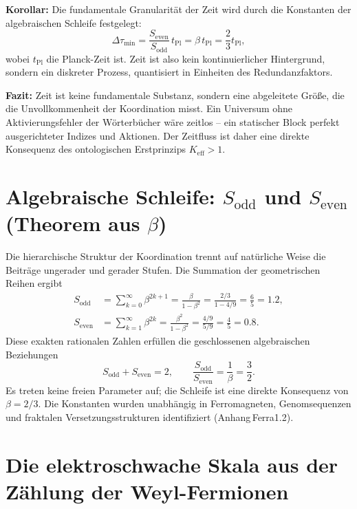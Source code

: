 \documentclass[12pt,a4paper]{article}
\begin{document}
	\noindent
	\textbf{Korollar:} Die fundamentale Granularität der Zeit wird durch die Konstanten der algebraischen Schleife festgelegt:
	\[
	\Delta \tau_{\min} = \frac{S_{\mathrm{even}}}{S_{\mathrm{odd}}} \, t_{\mathrm{Pl}}
	= \beta \, t_{\mathrm{Pl}} = \frac{2}{3} t_{\mathrm{Pl}},
	\]
	wobei \(t_{\mathrm{Pl}}\) die Planck-Zeit ist.  Zeit ist also kein kontinuierlicher Hintergrund, sondern ein diskreter Prozess, quantisiert in Einheiten des Redundanzfaktors.
	
	\noindent
	\textbf{Fazit:} Zeit ist keine fundamentale Substanz, sondern eine abgeleitete Größe, die die Unvollkommenheit der Koordination misst.  Ein Universum ohne Aktivierungsfehler der Wörterbücher wäre zeitlos – ein statischer Block perfekt ausgerichteter Indizes und Aktionen.  Der Zeitfluss ist daher eine direkte Konsequenz des ontologischen Erstprinzips \(K_{\mathrm{eff}} > 1\).
	
	\section{Algebraische Schleife: \(S_{\mathrm{odd}}\) und \(S_{\mathrm{even}}\) (Theorem aus \(\beta\))}
	
	Die hierarchische Struktur der Koordination trennt auf natürliche Weise die Beiträge ungerader und gerader Stufen.  Die Summation der geometrischen Reihen ergibt
	\begin{align}
		S_{\mathrm{odd}} &= \sum_{k=0}^{\infty} \beta^{2k+1} = \frac{\beta}{1-\beta^{2}} = \frac{2/3}{1 - 4/9} = \frac{6}{5} = 1.2, \label{eq:sodd}\\
		S_{\mathrm{even}} &= \sum_{k=1}^{\infty} \beta^{2k} = \frac{\beta^{2}}{1-\beta^{2}} = \frac{4/9}{5/9} = \frac{4}{5} = 0.8. \label{eq:seven}
	\end{align}
	Diese exakten rationalen Zahlen erfüllen die geschlossenen algebraischen Beziehungen
	\begin{equation}
		\boxed{S_{\mathrm{odd}} + S_{\mathrm{even}} = 2, \qquad \frac{S_{\mathrm{odd}}}{S_{\mathrm{even}}} = \frac{1}{\beta} = \frac{3}{2}}.
		\label{eq:algebraic-loop}
	\end{equation}
	Es treten keine freien Parameter auf; die Schleife ist eine direkte Konsequenz von \(\beta = 2/3\).  Die Konstanten wurden unabhängig in Ferromagneten, Genomsequenzen und fraktalen Versetzungsstrukturen identifiziert (Anhang Ferra1.2).
	
	\section{Die elektroschwache Skala aus der Zählung der Weyl-Fermionen}
	
\end{document}
